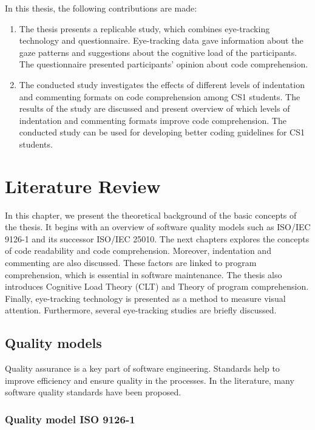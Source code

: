 In this thesis, the following contributions are made:
\begin{enumerate}

\item The thesis presents a replicable study, which combines eye-tracking technology and questionnaire. Eye-tracking data gave information about the gaze patterns and suggestions about the cognitive load of the participants. The questionnaire presented participants’ opinion about code comprehension.

\item  The conducted study investigates the effects of different levels of indentation and commenting formats on code comprehension among CS1 students. The results of the study are discussed and present overview of which levels of indentation and commenting formats improve code comprehension. The conducted study can be used for developing better coding guidelines for CS1 students.

\end{enumerate}

\chapter{Literature Review}
In this chapter, we present the theoretical background of the basic concepts of the thesis. It begins with an overview of software quality models such as ISO/IEC 9126-1 and its successor ISO/IEC 25010. The next chapters explores the concepts of code readability and code comprehension. Moreover, indentation and commenting are also discussed. These factors are  linked to program comprehension, which is essential in software maintenance. The thesis also introduces Cognitive Load Theory (CLT) and Theory of program comprehension. Finally,  eye-tracking technology is presented as a method to measure visual attention. Furthermore, several eye-tracking studies are briefly discussed. 



\section{Quality models}
Quality assurance is a key part of software engineering. Standards help to improve efficiency and ensure quality in the processes. In the literature, many software quality standards have been proposed.



\subsection{Quality model ISO 9126-1}

